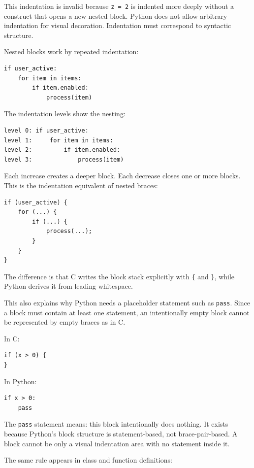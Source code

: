 This indentation is invalid because \texttt{z = 2} is indented more deeply without a construct that opens a new nested block. Python does not allow arbitrary indentation for visual decoration. Indentation must correspond to syntactic structure.

Nested blocks work by repeated indentation:

\begin{verbatim}
if user_active:
    for item in items:
        if item.enabled:
            process(item)
\end{verbatim}

The indentation levels show the nesting:

\begin{verbatim}
level 0: if user_active:
level 1:     for item in items:
level 2:         if item.enabled:
level 3:             process(item)
\end{verbatim}

Each increase creates a deeper block. Each decrease closes one or more blocks. This is the indentation equivalent of nested braces:

\begin{verbatim}
if (user_active) {
    for (...) {
        if (...) {
            process(...);
        }
    }
}
\end{verbatim}

The difference is that C writes the block stack explicitly with \texttt{\{} and \texttt{\}}, while Python derives it from leading whitespace.

This also explains why Python needs a placeholder statement such as \texttt{pass}. Since a block must contain at least one statement, an intentionally empty block cannot be represented by empty braces as in C.

In C:

\begin{verbatim}
if (x > 0) {
}
\end{verbatim}

In Python:

\begin{verbatim}
if x > 0:
    pass
\end{verbatim}

The \texttt{pass} statement means: this block intentionally does nothing. It exists because Python's block structure is statement-based, not brace-pair-based. A block cannot be only a visual indentation area with no statement inside it.

The same rule appears in class and function definitions:

